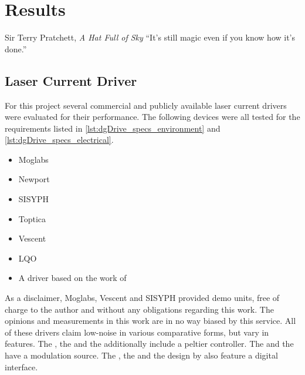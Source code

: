 \chapter{Results}
\begin{chapquote}{Sir Terry Pratchett, \textit{A Hat Full of Sky}}
``It's still magic even if you know how it's done.''
\end{chapquote}

\section{Laser Current Driver}
For this project several commercial and publicly available laser current drivers were evaluated for their performance. The following devices were all tested for the requirements listed in \ref{lst:dgDrive_specs_environment} and \ref{lst:dgDrive_specs_electrical}.
\begin{itemize}
    \item Moglabs 
    \item Newport 
    \item SISYPH 
    \item Toptica 
    \item Vescent 
    \item LQO  \cite{datasheet_LQprO}
    \item A driver based on the work of \citeauthor{laser_driver_digital} \cite{laser_driver_digital}
\end{itemize}

As a disclaimer, Moglabs, Vescent and SISYPH provided demo units, free of charge to the author and without any obligations regarding this work. The opinions and measurements in this work are in no way biased by this service. All of these drivers claim low-noise in various comparative forms, but vary in features. The , the  and the  additionally include a peltier controller. The  and the  have a modulation source. The , the  and the design by \citeauthor{laser_driver_digital} also feature a digital interface.

